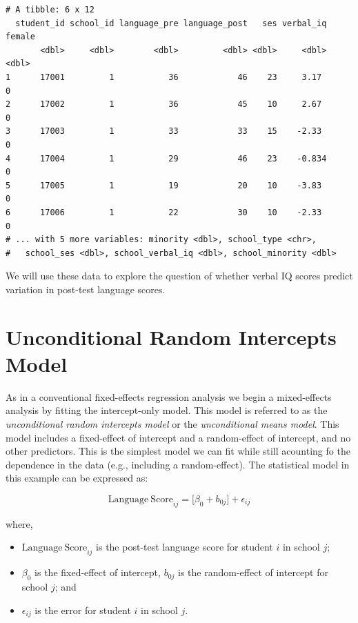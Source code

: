 \documentclass[]{book}
\providecommand{\tightlist}{%
  \setlength{\itemsep}{0pt}\setlength{\parskip}{0pt}}
\begin{document}
\begin{verbatim}
# A tibble: 6 x 12
  student_id school_id language_pre language_post   ses verbal_iq female
       <dbl>     <dbl>        <dbl>         <dbl> <dbl>     <dbl>  <dbl>
1      17001         1           36            46    23     3.17       0
2      17002         1           36            45    10     2.67       0
3      17003         1           33            33    15    -2.33       0
4      17004         1           29            46    23    -0.834      0
5      17005         1           19            20    10    -3.83       0
6      17006         1           22            30    10    -2.33       0
# ... with 5 more variables: minority <dbl>, school_type <chr>,
#   school_ses <dbl>, school_verbal_iq <dbl>, school_minority <dbl>
\end{verbatim}

We will use these data to explore the question of whether verbal IQ scores predict variation in post-test language scores.

\hypertarget{unconditional-random-intercepts-model}{%
\section{Unconditional Random Intercepts Model}\label{unconditional-random-intercepts-model}}

As in a conventional fixed-effects regression analysis we begin a mixed-effects analysis by fitting the intercept-only model. This model is referred to as the \emph{unconditional random intercepts model} or the \emph{unconditional means model}. This model includes a fixed-effect of intercept and a random-effect of intercept, and no other predictors. This is the simplest model we can fit while still acounting fo the dependence in the data (e.g., including a random-effect). The statistical model in this example can be expressed as:

\[
\mathrm{Language~Score}_{ij} = \big[\beta_0 + b_{0j}\big] + \epsilon_{ij}
\]

where,

\begin{itemize}
\tightlist
\item
  \(\mathrm{Language~Score}_{ij}\) is the post-test language score for student \(i\) in school \(j\);
\item
  \(\beta_0\) is the fixed-effect of intercept, \(b_{0j}\) is the random-effect of intercept for school \(j\); and
\item
  \(\epsilon_{ij}\) is the error for student \(i\) in school \(j\).
\end{itemize}
\end{document}
